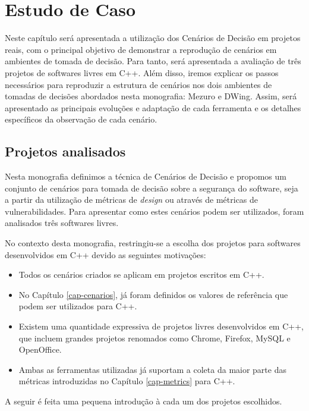 \chapter{Estudo de Caso}
\label{cap-case-study}

%

Neste capítulo será apresentada a utilização dos Cenários de Decisão em projetos reais, com o principal objetivo de demonstrar a reprodução de cenários em ambientes de tomada de decisão. Para tanto, será apresentada a avaliação de três projetos de softwares livres em C++. Além disso, iremos explicar os passos necessários para reproduzir a estrutura de cenários nos dois ambientes de tomadas de decisões abordados nesta monografia: Mezuro e DWing. Assim, será apresentado as principais evoluções e adaptação de cada ferramenta e os detalhes específicos da observação de cada cenário.

\section{Projetos analisados}
\label{cap-mezuro}

Nesta monografia definimos a técnica de Cenários de Decisão e propomos um conjunto de cenários para tomada de decisão sobre a segurança do software, seja a partir da utilização de métricas de \emph{design} ou através de métricas de vulnerabilidades. Para apresentar como estes cenários podem ser utilizados, foram analisados três softwares livres. 

No contexto desta monografia, restringiu-se a escolha dos projetos para softwares desenvolvidos em C++ devido as seguintes motivações:

\begin{itemize}
\item Todos os cenários criados se aplicam em projetos escritos em C++.
\item No Capítulo \ref{cap-cenarios}, já foram definidos os valores de referência que podem ser utilizados para C++.
\item Existem uma quantidade expressiva de projetos livres desenvolvidos em C++, que incluem grandes projetos renomados como Chrome, Firefox, MySQL e OpenOffice.
\item Ambas as ferramentas utilizadas já suportam a coleta da maior parte das métricas introduzidas no Capítulo \ref{cap-metrics} para C++.
\end{itemize}

A seguir é feita uma pequena introdução à cada um dos projetos escolhidos.

